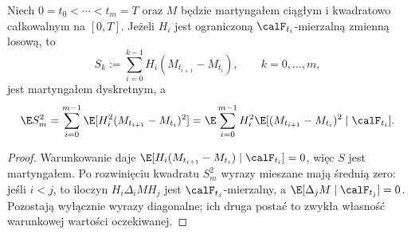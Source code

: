 \begin{lemat}
\label{lem:discrete-isometry}
Niech $0=t_0<\cdots<t_m=T$ oraz
$M$ będzie martyngałem ciągłym i kwadratowo całkowalnym
na $[0,T]$. Jeżeli $H_i$ jest ograniczoną
$\calF_{t_i}$-mierzalną zmienną losową, to
\[
S_k:=\sum_{i=0}^{k-1}H_i(M_{t_{i+1}}-M_{t_i}),
\qquad k=0,\ldots,m,
\]
jest martyngałem dyskretnym, a
\[
\E S_m^2
=\sum_{i=0}^{m-1}\E[H_i^2(M_{t_{i+1}}-M_{t_i})^2]
=\E\sum_{i=0}^{m-1}H_i^2
\E[(M_{t_{i+1}}-M_{t_i})^2\mid\calF_{t_i}].
\]
\end{lemat}
\begin{proof}
Warunkowanie daje
$\E[H_i(M_{t_{i+1}}-M_{t_i})\mid\calF_{t_i}]=0$,
więc $S$ jest martyngałem. Po rozwinięciu kwadratu
$S_m^2$ wyrazy mieszane mają średnią zero:
jeśli $i<j$, to iloczyn
$H_i\Delta_iM H_j$ jest $\calF_{t_j}$-mierzalny,
a $\E[\Delta_jM\mid\calF_{t_j}]=0$.
Pozostają wyłącznie wyrazy diagonalne; ich druga
postać to zwykła własność warunkowej wartości oczekiwanej.
\end{proof}

